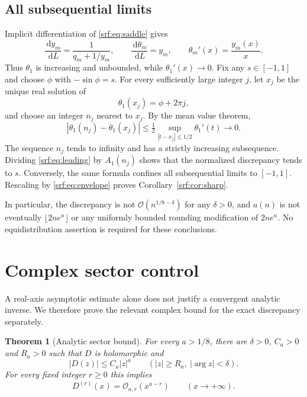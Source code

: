 \documentclass[11pt]{article}
\newtheorem{theorem}{Theorem}[section]
\theoremstyle{remark}\newtheorem{remark}[theorem]{Remark}
\newcommand{\OO}{\mathcal O}
\newcommand{\dd}{\,\mathrm d}
\begin{document}
\subsection{All subsequential limits}
Implicit differentiation of \eqref{srf:eq:saddle} gives
\[
 \frac{\dd y_m}{\dd L}=\frac1{q_m+1/y_m},\qquad
 \frac{\dd\theta_m}{\dd L}=y_m,\qquad
 \theta_m'(x)=\frac{y_m(x)}x.
\]
Thus $\theta_1$ is increasing and unbounded, while $\theta_1'(x)\to0$. Fix any $s\in[-1,1]$ and choose $\phi$ with $-\sin\phi=s$. For every sufficiently large integer $j$, let $x_j$ be the unique real solution of
\[
 \theta_1(x_j)=\phi+2\pi j,
\]
and choose an integer $n_j$ nearest to $x_j$. By the mean value theorem,
\[
 |\theta_1(n_j)-\theta_1(x_j)|
 \le\tfrac12\sup_{|t-x_j|\le1/2}\theta_1'(t)\longrightarrow0.
\]
The sequence $n_j$ tends to infinity and has a strictly increasing subsequence. Dividing \eqref{srf:eq:leading} by $A_1(n_j)$ shows that the normalized discrepancy tends to $s$. Conversely, the same formula confines all subsequential limits to $[-1,1]$. Rescaling by \eqref{srf:eq:envelope} proves Corollary~\ref{srf:cor:sharp}.

In particular, the discrepancy is not $\OO(n^{1/8-\delta})$ for any $\delta>0$, and $a(n)$ is not eventually $\lfloor2ne^n\rfloor$ or any uniformly bounded rounding modification of $2ne^n$. No equidistribution assertion is required for these conclusions.

\section{Complex sector control}\label{srf:sec:sector}
A real-axis asymptotic estimate alone does not justify a convergent analytic inverse. We therefore prove the relevant complex bound for the exact discrepancy separately.

\begin{theorem}[Analytic sector bound]\label{srf:thm:sector}
For every $a>1/8$, there are $\delta>0$, $C_a>0$ and $R_a>0$ such that $D$ is holomorphic and
\begin{equation}\label{srf:eq:sectorbound}
 |D(z)|\le C_a|z|^a
 \qquad(|z|\ge R_a,\ |\arg z|<\delta).
\end{equation}
For every fixed integer $r\ge0$ this implies
\begin{equation}\label{srf:eq:derivativebound}
 D^{(r)}(x)=\OO_{a,r}(x^{a-r})\qquad(x\to+\infty).
\end{equation}
\end{theorem}
\end{document}
